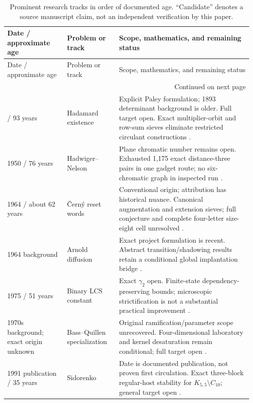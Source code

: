 \begingroup
\small
\setlength{\tabcolsep}{4pt}
\begin{longtable}{p{}p{}p{}}
\caption{Prominent research tracks in order of documented age. ``Candidate'' denotes a source manuscript claim, not an independent verification by this paper.}\label{tab:chronology}\\
\toprule
Date / approximate age & Problem or track & Scope, mathematics, and remaining status \\
\midrule\endfirsthead
\toprule Date / approximate age & Problem or track & Scope, mathematics, and remaining status \\
\midrule\endhead
\midrule\multicolumn{3}{r}{Continued on next page}\\\endfoot
\bottomrule\endlastfoot
1933 / 93 years & Hadamard existence & Explicit Paley formulation; 1893 determinant background is older. Full target open. Exact multiplier-orbit and row-sum sieves eliminate restricted circulant constructions \citep{Paley1933,CaseHadamard2026}.\\[0.55em]
1950 / 76 years & Hadwiger--Nelson & Plane chromatic number remains open. Exhausted 1,175 exact distance-three pairs in one gadget route; no six-chromatic graph in inspected run \citep{Exoo2018NelsonHistory,CaseHadwigerNelson2026}.\\[0.55em]
1964 / about 62 years & \v Cern\'y reset words & Conventional origin; attribution has historical nuance. Canonical augmentation and extension sieves; full conjecture and complete four-letter size-eight cell unresolved \citep{Cerny1964,CaseCerny2026}.\\[0.55em]
1964 background & Arnold diffusion & Exact project formulation is recent. Abstract transition/shadowing results retain a conditional global implantation bridge \citep{CaseBroadSolvedRegister2026}.\\[0.55em]
1975 / 51 years & Binary LCS constant & Exact $\gamma_2$ open. Finite-state dependency-preserving bounds; microscopic strictification is not a substantial practical improvement \citep{ChvatalSankoff1975,CaseProgress2026}.\\[0.55em]
1970s background; exact origin unknown & Bass--Quillen specialization & Original ramification/parameter scope unrecovered. Four-dimensional laboratory and kernel desaturation remain conditional; full target open \citep{CaseBassQuillen2026}.\\[0.55em]
1991 publication / 35 years & Sidorenko & Date is documented publication, not proven first circulation. Exact three-block regular-host stability for $K_{5,5}\setminus C_{10}$; general target open \citep{Sidorenko1991,CaseSidorenko2026}.\\[0.55em]

\end{longtable}
